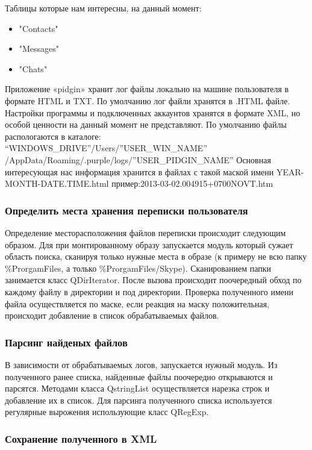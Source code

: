 Таблицы которые нам интересны, на данный момент:    

\begin{itemize}
\item"Contacts"
\item"Messages"
\item"Chats" 
\end{itemize}

Приложение «pidgin» хранит лог файлы локально на машине пользователя в формате HTML и TXT. По умолчанию лог файли хранятся в .HTML файле. Настройки программы и подключенных аккаунтов хранятся в формате XML, но особой ценности на данный момент не представляют.
По умолчанию файлы распологаются в каталоге:\\ “WINDOWS\_DRIVE”/Users/”USER\_WIN\_NAME”\\/AppData/Roaming/.purple/logs/”USER\_PIDGIN\_NAME”
Основная интересующая нас информация хранится в файлах с такой маской имени YEAR-MONTH-DATE.TIME.html пример:2013-03-02.004915+0700NOVT.htm

\subsubsection{Определить места хранения переписки пользователя}

Определение месторасположения файлов переписки происходит следующим образом. Для при монтированному образу запускается модуль который сужает область поиска, сканируя только нужные места в образе (к примеру не всю папку \%ProrgamFiles, а только \%ProrgamFiles/Skype). Сканированием папки занимается класс QDirIterator. После вызова происходит поочередный обход по каждому файлу в директории и под директории. Проверка полученного имени файла  осуществляется по маске, если реакция на маску положительная, происходит добавление в список обрабатываемых файлов. 


\subsubsection{Парсинг найденых файлов}

В зависимости от обрабатываемых логов, запускается нужный модуль. Из полученного ранее списка, найденные файлы поочередно открываются и парсятся. Методами класса QstringList осуществляется нарезка строк и добавление их в список. Для парсинга полученного списка используется регулярные вырожения использующие класс QRegExp. 

\subsubsection{Сохранение полученного в XML}

